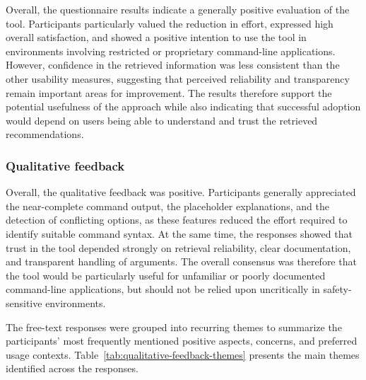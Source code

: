 Overall, the questionnaire results indicate a generally positive evaluation of the tool. Participants particularly valued the reduction in effort, expressed high overall satisfaction, and showed a positive intention to use the tool in environments involving restricted or proprietary command-line applications. However, confidence in the retrieved information was less consistent than the other usability measures, suggesting that perceived reliability and transparency remain important areas for improvement. The results therefore support the potential usefulness of the approach while also indicating that successful adoption would depend on users being able to understand and trust the retrieved recommendations.

\subsubsection{Qualitative feedback}

Overall, the qualitative feedback was positive. Participants generally appreciated the near-complete command output, the placeholder explanations, and the detection of conflicting options, as these features reduced the effort required to identify suitable command syntax. At the same time, the responses showed that trust in the tool depended strongly on retrieval reliability, clear documentation, and transparent handling of arguments. The overall consensus was therefore that the tool would be particularly useful for unfamiliar or poorly documented command-line applications, but should not be relied upon uncritically in safety-sensitive environments.

The free-text responses were grouped into recurring themes to summarize the participants' most frequently mentioned positive aspects, concerns, and preferred usage contexts. Table~\ref{tab:qualitative-feedback-themes} presents the main themes identified across the responses.

